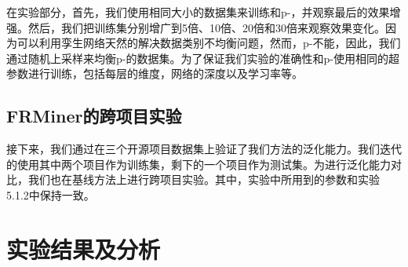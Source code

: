 在实验部分，首先，我们使用相同大小的数据集来训练{\tool}和p-{\tool}，并观察最后的效果增强。然后，我们把训练集分别增广到5倍、10倍、20倍和30倍来观察效果变化。因为{\tool}可以利用孪生网络天然的解决数据类别不均衡问题，然而，p-{\tool}不能，因此，我们通过随机上采样来均衡p-{\tool}的数据集。为了保证我们实验的准确性{\tool}和p-{\tool}使用相同的超参数进行训练，包括每层的维度，网络的深度以及学习率等。
\subsection{FRMiner的跨项目实验}
接下来，我们通过在三个开源项目数据集上验证了我们方法的泛化能力。我们迭代的使用其中两个项目作为训练集，剩下的一个项目作为测试集。为进行泛化能力对比，我们也在基线方法上进行跨项目实验。其中，实验中所用到的参数和实验5.1.2中保持一致。

\section{实验结果及分析}
